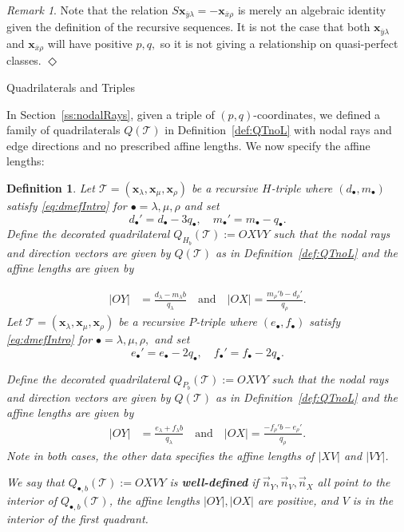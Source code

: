 \documentclass[11pt, reqno]{amsart}
\makeatletter
\def\subsection{\@startsection{subsection}{2}%
  \z@{.5\linespacing\@plus.7\linespacing}{-.5em}%
  {\normalfont\large\bfseries}}
\newtheorem{definition}[thm]{Definition}
\theoremstyle{remark}
\numberwithin{equation}{subsection}
\numberwithin{figure}{section}
\theoremstyle{customremark}
\newtheorem{rmk_no_diamond}[thm]{Remark}
\newenvironment{rmk}{\begin{rmk_no_diamond} } {\hfill$\er$ \end{rmk_no_diamond}}
\newcommand{\Tt}{\mathcal{T}}
\newcommand{\vn}{{\vec{n}}}
\newcommand{\ovx}{{\ov{x}}}
\newcommand{\ovy}{{\ov{y}}}
\newcommand{\ov}{\overline}
\newcommand{\la}{{\lambda}}
\newcommand{\er}{{\Diamond}}
\makeatother
\begin{document}
\begin{rmk} \rm
   Note that the relation $S\bm{x}_{\ovy\la}=-\bm{x}_{\ovx\rho}$ is merely an algebraic identity given the definition of the recursive sequences. It is not the case that both $\bm{x}_{\ovy\la}$ and $\bm{x}_{\ovx\rho}$ will have positive $p,q,$ so it is not giving a relationship on quasi-perfect classes.  
\end{rmk}



\subsection{Quadrilaterals and Triples} \label{ss:ATFandTrip}

In Section~\ref{ss:nodalRays}, given a triple of $(p,q)$-coordinates, we defined a family of quadrilaterals $Q(\Tt)$ in Definition~\ref{def:QTnoL} with nodal rays and edge directions and no prescribed affine lengths. We now specify the affine lengths: 
\begin{definition} \label{def:DecQuad}
   Let $\Tt=(\bm{x}_\la,\bm{x}_\mu,\bm{x}_\rho)$ be a recursive $H$-triple where $(d_\bullet,m_\bullet)$ satisfy \eqref{eq:dmefIntro} for $\bullet=\la,\mu,\rho$ and set
   \[ d_\bullet'=d_\bullet-3q_\bullet, \quad m_\bullet'=m_\bullet-q_\bullet. \]
    Define the decorated quadrilateral $Q_{H_b}(\Tt):=OXVY$ such that the nodal rays and direction vectors are given by $Q(\Tt)$ as in Definition~\ref{def:QTnoL}
    and the affine lengths are given by
 
\begin{align}
\label{eq:QTH}
    |OY|&=\frac{d_\la-m_\la b}{q_\la} \quad \text{and} \quad |OX|=\frac{m_\rho'b-d_\rho'}{q_\rho}. 
\end{align} 
Let $\Tt=(\bm{x}_\la,\bm{x}_\mu,\bm{x}_\rho)$ be a recursive $P$-triple where $(e_\bullet,f_\bullet)$ satisfy \eqref{eq:dmefIntro} for $\bullet=\la,\mu,\rho,$ and set
   \[ e_\bullet'=e_\bullet-2q_\bullet, \quad f_\bullet'=f_\bullet-2q_\bullet. \]
  
    Define the decorated quadrilateral $Q_{P_b}(\Tt):=OXVY$ such that the nodal rays and direction vectors are given by $Q(\Tt)$ as in Definition~\ref{def:QTnoL}
    and the affine lengths are given by
\begin{align} \label{eq:QTP}
 |OY|&=\frac{e_\la+f_\la b}{q_\la} \quad \text{and} \quad |OX|=\frac{-f_\rho'b-e_\rho'}{q_\rho}. 
\end{align}
Note in both cases, the other data specifies the affine lengths of $|XV|$ and $|VY|$. 

We say that $Q_{\bullet,b}(\Tt):=OXVY$ is {\bf well-defined} if $\vn_Y,\vn_V,\vn_X$ all point to the interior of $Q_{\bullet,b}(\Tt)$, the affine lengths $|OY|,|OX|$ are positive, and $V$ is in the interior of the first quadrant.
\end{definition}
\end{document}
